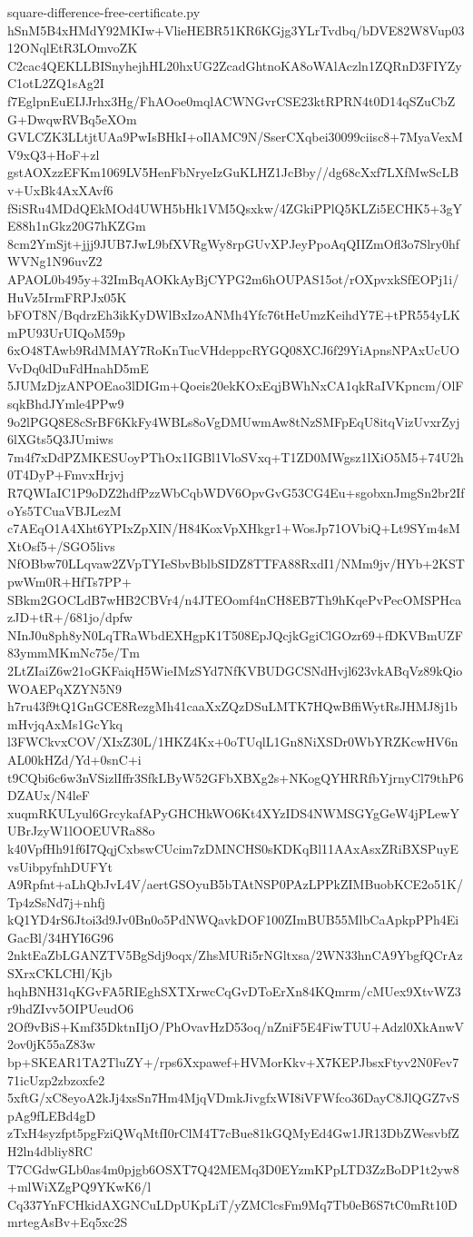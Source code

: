 \documentclass[11pt]{article}
\theoremstyle{definition}
\theoremstyle{remark}
\begin{document}
\begin{filecontents*}[overwrite]{square-difference-free-certificate.py}
hSnM5B4xHMdY92MKIw+VlieHEBR51KR6KGjg3YLrTvdbq/bDVE82W8Vup0312ONqlEtR3LOmvoZK
C2cac4QEKLLBISnyhejhHL20hxUG2ZcadGhtnoKA8oWAlAczln1ZQRnD3FIYZyC1otL2ZQ1sAg2I
f7EglpnEuEIJJrhx3Hg/FhAOoe0mqlACWNGvrCSE23ktRPRN4t0D14qSZuCbZG+DwqwRVBq5eXOm
GVLCZK3LLtjtUAa9PwIsBHkI+oIlAMC9N/SserCXqbei30099ciisc8+7MyaVexMV9xQ3+HoF+zl
gstAOXzzEFKm1069LV5HenFbNryeIzGuKLHZ1JcBby//dg68cXxf7LXfMwScLBv+UxBk4AxXAvf6
fSiSRu4MDdQEkMOd4UWH5bHk1VM5Qsxkw/4ZGkiPPlQ5KLZi5ECHK5+3gYE88h1nGkz20G7hKZGm
8cm2YmSjt+jjj9JUB7JwL9bfXVRgWy8rpGUvXPJeyPpoAqQIIZmOfl3o7Slry0hfWVNg1N96uvZ2
APAOL0b495y+32ImBqAOKkAyBjCYPG2m6hOUPAS15ot/rOXpvxkSfEOPj1i/HuVz5IrmFRPJx05K
bFOT8N/BqdrzEh3ikKyDWlBxIzoANMh4Yfc76tHeUmzKeihdY7E+tPR554yLKmPU93UrUIQoM59p
6xO48TAwb9RdMMAY7RoKnTucVHdeppcRYGQ08XCJ6f29YiApnsNPAxUcUOVvDq0dDuFdHnahD5mE
5JUMzDjzANPOEao3lDIGm+Qoeis20ekKOxEqjBWhNxCA1qkRaIVKpncm/OlFsqkBhdJYmle4PPw9
9o2lPGQ8E8cSrBF6KkFy4WBLs8oVgDMUwmAw8tNzSMFpEqU8itqVizUvxrZyj6lXGts5Q3JUmiws
7m4f7xDdPZMKESUoyPThOx1IGBl1VloSVxq+T1ZD0MWgsz1lXiO5M5+74U2h0T4DyP+FmvxHrjvj
R7QWIaIC1P9oDZ2hdfPzzWbCqbWDV6OpvGvG53CG4Eu+sgobxnJmgSn2br2IfoYs5TCuaVBJLezM
c7AEqO1A4Xht6YPIxZpXIN/H84KoxVpXHkgr1+WosJp71OVbiQ+Lt9SYm4sMXtOsf5+/SGO5livs
NfOBbw70LLqvaw2ZVpTYIeSbvBblbSIDZ8TTFA88RxdI1/NMm9jv/HYb+2KSTpwWm0R+HfTs7PP+
SBkm2GOCLdB7wHB2CBVr4/n4JTEOomf4nCH8EB7Th9hKqePvPecOMSPHcazJD+tR+/681jo/dpfw
NInJ0u8ph8yN0LqTRaWbdEXHgpK1T508EpJQcjkGgiClGOzr69+fDKVBmUZF83ymmMKmNc75e/Tm
2LtZIaiZ6w21oGKFaiqH5WieIMzSYd7NfKVBUDGCSNdHvjl623vkABqVz89kQioWOAEPqXZYN5N9
h7ru43f9tQ1GnGCE8RezgMh41caaXxZQzDSuLMTK7HQwBffiWytRsJHMJ8j1bmHvjqAxMs1GcYkq
l3FWCkvxCOV/XIxZ30L/1HKZ4Kx+0oTUqlL1Gn8NiXSDr0WbYRZKcwHV6nAL00kHZd/Yd+0snC+i
t9CQbi6c6w3nVSizlIffr3SfkLByW52GFbXBXg2s+NKogQYHRRfbYjrnyCl79thP6DZAUx/N4leF
xuqmRKULyul6GrcykafAPyGHCHkWO6Kt4XYzIDS4NWMSGYgGeW4jPLewYUBrJzyW1lOOEUVRa88o
k40VpfHh91f6I7QqjCxbswCUcim7zDMNCHS0sKDKqBl11AAxAsxZRiBXSPuyEvsUibpyfnhDUFYt
A9Rpfnt+aLhQbJvL4V/aertGSOyuB5bTAtNSP0PAzLPPkZIMBuobKCE2o51K/Tp4zSsNd7j+nhfj
kQ1YD4rS6Jtoi3d9Jv0Bn0o5PdNWQavkDOF100ZImBUB55MlbCaApkpPPh4EiGacBl/34HYI6G96
2nktEaZbLGANZTV5BgSdj9oqx/ZhsMURi5rNGltxsa/2WN33hnCA9YbgfQCrAzSXrxCKLCHl/Kjb
hqhBNH31qKGvFA5RIEghSXTXrwcCqGvDToErXn84KQmrm/cMUex9XtvWZ3r9hdZIvv5OIPUeudO6
2Of9vBiS+Kmf35DktnIIjO/PhOvavHzD53oq/nZniF5E4FiwTUU+Adzl0XkAnwV2ov0jK55aZ83w
bp+SKEAR1TA2TluZY+/rps6Xxpawef+HVMorKkv+X7KEPJbsxFtyv2N0Fev771icUzp2zbzoxfe2
5xftG/xC8eyoA2kJj4xsSn7Hm4MjqVDmkJivgfxWI8iVFWfco36DayC8JlQGZ7vSpAg9fLEBd4gD
zTxH4syzfpt5pgFziQWqMtfI0rClM4T7cBue81kGQMyEd4Gw1JR13DbZWesvbfZH2ln4dbliy8RC
T7CGdwGLb0as4m0pjgb6OSXT7Q42MEMq3D0EYzmKPpLTD3ZzBoDP1t2yw8+mlWiXZgPQ9YKwK6/l
Cq337YnFCHkidAXGNCuLDpUKpLiT/yZMClcsFm9Mq7Tb0eB6S7tC0mRt10DmrtegAsBv+Eq5xc2S

\end{filecontents*}
\end{document}
